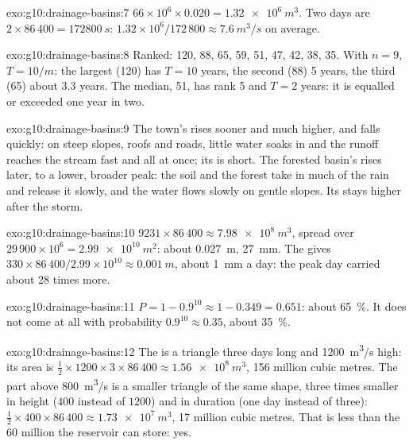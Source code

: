 \begin{solution}{exo:g10:drainage-basins:7}
$66 \times 10^6 \times 0.020 = \qty{1.32e6}{m^3}$. Two days are
$2 \times 86\,400 = \qty{172800}{s}$: $1.32 \times 10^6/172\,800 \approx
\qty{7.6}{m^3/s}$ on average.
\end{solution}

\begin{solution}{exo:g10:drainage-basins:8}
Ranked: 120, 88, 65, 59, 51, 47, 42, 38, 35. With $n = 9$, $T = 10/m$: the
largest (120) has $T = 10$ years, the second (88) 5 years, the third (65)
about 3.3 years. The median, 51, has rank 5 and $T = 2$ years: it is equalled
or exceeded one year in two.
\end{solution}

\begin{solution}{exo:g10:drainage-basins:9}
The town's  rises sooner and much higher, and falls quickly: on
steep slopes, roofs and roads, little water soaks in and the runoff reaches
the stream fast and all at once; its  is short. The forested basin's
 rises later, to a lower, broader peak: the soil and the forest
take in much of the rain and release it slowly, and the water flows slowly on
gentle slopes. Its  stays higher after the storm.
\end{solution}

\begin{solution}{exo:g10:drainage-basins:10}
$9231 \times 86\,400 \approx \qty{7.98e8}{m^3}$, spread over
$29\,900 \times 10^6 = \qty{2.99e10}{m^2}$: about \qty{0.027}{m},
\qty{27}{mm}. The  gives $330 \times 86\,400/2.99 \times 10^{10}
\approx \qty{0.001}{m}$, about \qty{1}{mm} a day: the peak day carried about
28 times more.
\end{solution}

\begin{solution}{exo:g10:drainage-basins:11}
$P = 1 - 0.9^{10} \approx 1 - 0.349 = 0.651$: about \qty{65}{\percent}. It
does not come at all with probability $0.9^{10} \approx 0.35$, about
\qty{35}{\percent}.
\end{solution}

\begin{solution}{exo:g10:drainage-basins:12}
The  is a triangle three days long and \qty{1200}{m^3/s} high: its
area is $\tfrac12 \times 1200 \times 3 \times 86\,400 \approx
\qty{1.56e8}{m^3}$, \num{156} million cubic metres. The part above
\qty{800}{m^3/s} is a smaller triangle of the same shape, three times
smaller in height ($400$ instead of $1200$) and in duration (one day instead
of three): $\tfrac12 \times 400 \times 86\,400 \approx \qty{1.73e7}{m^3}$,
\num{17} million cubic metres. That is less than the \num{60} million the
reservoir can store: yes.
\end{solution}

